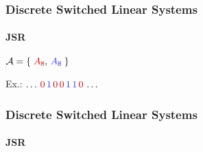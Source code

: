 \begin{frame}
    \frametitle{Discrete Switched Linear Systems}
    \framesubtitle{JSR}
    \begin{minipage}{0.59\textwidth}
        \begin{figure}[h]
            \centering
            
        \end{figure}
    \end{minipage}\hfill
    \begin{minipage}{0.39\textwidth}
        \begin{figure}[h]
            \centering
        \end{figure}
    \end{minipage}

    \begin{minipage}{0.59\textwidth}
        \centering
        \large
        $\mathcal{A} = \left\{ \;\textcolor{red!80!black}{A_{\texttt{M}}}, \,\textcolor{hicolour}{A_{\texttt{H}}}\; \right\}$
    \end{minipage}\hfill
    \begin{minipage}{0.39\textwidth}
        \centering
        \large
        Ex.: $\dots \,\textcolor{red!80!black}{0} \, \textcolor{hicolour}{1} \, \textcolor{red!80!black}{0} \, \textcolor{red!80!black}{0} \, \textcolor{hicolour}{1} \, \textcolor{hicolour}{1}\, \textcolor{red!80!black}{0} \,\dots$
    \end{minipage}
\end{frame}


\begin{frame}
    \frametitle{Discrete Switched Linear Systems}
    \framesubtitle{JSR}
    \begin{figure}[h]
        \centering
        
    \end{figure}
\end{frame}
